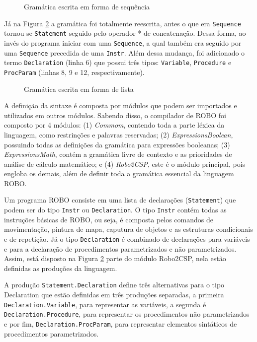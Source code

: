 \begin{figure}[h]
\caption{Gramática escrita em forma de sequência}

\label{fig:gramatica_antes}
\end{figure}

Já na Figura \ref{fig:gramatica} a gramática foi totalmente reescrita, antes o que era \texttt{Sequence} tornou-se \texttt{Statement} seguido pelo operador * de concatenação. Dessa forma, ao invés do programa iniciar com uma \texttt{Sequence}, a qual também era seguido por uma \texttt{Sequence} precedida de uma \texttt{Instr}. Além dessa mudança, foi adicionado o termo \texttt{Declaration} (linha 6) que possui três tipos: \texttt{Variable}, \texttt{Procedure} e \texttt{ProcParam} (linhas 8, 9 e 12, respectivamente).

\begin{figure}[h]
\caption{Gramática escrita em forma de lista}

\label{fig:gramatica}
\end{figure}

A definição da sintaxe é composta por módulos que podem ser importados e utilizados em outros módulos. Sabendo disso, o compilador de ROBO foi composto por 4 módulos: (1) \textit{Commom}, contendo toda a parte léxica da linguagem, como restrinções e palavras reservadas; (2) \textit{ExpressionsBoolean}, possuindo todas as definições da gramática para expressões booleanas; (3) \textit{ExpressionsMath}, contém a gramática livre de contexto e as prioridades de análise de cálculo matemático; e (4) \textit{Robo2CSP}, este é o módulo principal, pois engloba os demais, além de definir toda a gramática essencial da linguagem ROBO.

Um programa ROBO consiste em uma lista de declarações (\texttt{Statement}) que podem ser do tipo \texttt{Instr} ou \texttt{Declaration}. O tipo \texttt{Instr} contém todas as instruções básicas de ROBO, ou seja, é composta pelos comandos de movimentação, pintura de mapa, caputura de objetos e as estruturas condicionais e de repetição. Já o tipo \texttt{Declaration} é combinado de declarações para variáveis e para a declaração de procedimentos parametrizados e não parametrizados. Assim, está disposto na Figura \ref{fig:gramatica} parte do módulo Robo2CSP, nela estão definidas as produções da linguagem.

A produção \texttt{Statement.Declaration} define três alternativas para o tipo Declaration que estão definidas em três produções separadas, a primeira \texttt{Declaration.Varia\-ble}, para representar as variáveis, a segunda é \texttt{Declaration.Procedure}, para representar os procedimentos não parametrizados e por fim, \texttt{Declaration.ProcParam}, para representar elementos sintáticos de procedimentos parametrizados.


